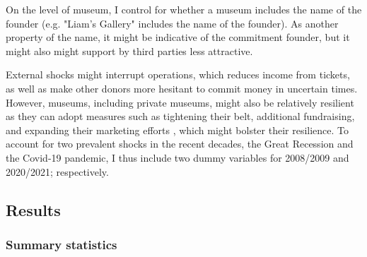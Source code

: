 \documentclass[12pt]{article}
\begin{document}
On the level of museum, I control for whether a museum includes the name of the founder (e.g. "Liam's Gallery" includes the name of the founder).
As another property of the name, it might be indicative of the commitment founder, but it might also might support by third parties less attractive.

External shocks might interrupt operations, which reduces income from tickets, as well as make other donors more hesitant to commit money in uncertain times.
However, museums, including private museums, might also be relatively resilient as they can adopt measures such as tightening their belt, additional fundraising, and expanding their marketing efforts \parencite{Geller_Salamon_2010_resilience}, which might bolster their resilience.
To account for two prevalent shocks in the recent decades, the Great Recession and the Covid-19 pandemic, I thus include two dummy variables for 2008/2009 and 2020/2021; respectively.
\subsection*{Results}


\subsubsection*{Summary statistics}
\end{document}
